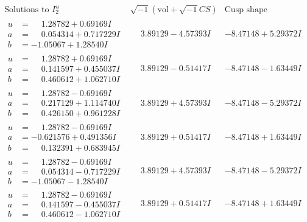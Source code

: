 \documentclass[1p]{elsarticle_modified}
\theoremstyle{definition}
\newcommand{\I}{\sqrt{-1}}
\begin{document}
$$\begin{array}{c|c|c}
\text{Solutions to }I^u_{2}& \I (\text{vol} + \sqrt{-1}CS) & \text{Cusp shape}\\
 \hline 
\begin{aligned}
u &= \phantom{-}1.28782 + 0.69169 I \\
a &= \phantom{-}0.054314 + 0.717229 I \\
b &= -1.05067 + 1.28540 I\end{aligned}
 & \phantom{-}3.89129 - 4.57393 I & -8.47148 + 5.29372 I \\ \hline\begin{aligned}
u &= \phantom{-}1.28782 + 0.69169 I \\
a &= \phantom{-}0.141597 + 0.455037 I \\
b &= \phantom{-}0.460612 + 1.062710 I\end{aligned}
 & \phantom{-}3.89129 - 0.51417 I & -8.47148 - 1.63449 I \\ \hline\begin{aligned}
u &= \phantom{-}1.28782 - 0.69169 I \\
a &= \phantom{-}0.217129 + 1.114740 I \\
b &= \phantom{-}0.426150 + 0.961228 I\end{aligned}
 & \phantom{-}3.89129 + 4.57393 I & -8.47148 - 5.29372 I \\ \hline\begin{aligned}
u &= \phantom{-}1.28782 - 0.69169 I \\
a &= -0.621576 + 0.491356 I \\
b &= \phantom{-}0.132391 + 0.683945 I\end{aligned}
 & \phantom{-}3.89129 + 0.51417 I & -8.47148 + 1.63449 I \\ \hline\begin{aligned}
u &= \phantom{-}1.28782 - 0.69169 I \\
a &= \phantom{-}0.054314 - 0.717229 I \\
b &= -1.05067 - 1.28540 I\end{aligned}
 & \phantom{-}3.89129 + 4.57393 I & -8.47148 - 5.29372 I \\ \hline\begin{aligned}
u &= \phantom{-}1.28782 - 0.69169 I \\
a &= \phantom{-}0.141597 - 0.455037 I \\
b &= \phantom{-}0.460612 - 1.062710 I\end{aligned}
 & \phantom{-}3.89129 + 0.51417 I & -8.47148 + 1.63449 I \\ \hline\begin{aligned}

\end{aligned}
\end{array}$$
\end{document}

